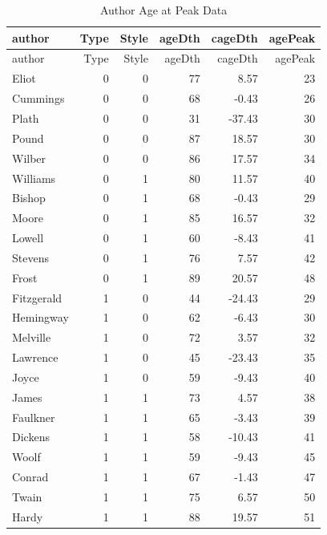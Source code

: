 \documentclass[
]{book}
\begin{document}
\begin{longtable}[]{@{}lrrrrr@{}}
\caption{Author Age at Peak Data}\tabularnewline
\toprule\noalign{}
author & Type & Style & ageDth & cageDth & agePeak \\
\midrule\noalign{}
\endfirsthead
\toprule\noalign{}
author & Type & Style & ageDth & cageDth & agePeak \\
\midrule\noalign{}
\endhead
\bottomrule\noalign{}
\endlastfoot
Eliot & 0 & 0 & 77 & 8.57 & 23 \\
Cummings & 0 & 0 & 68 & -0.43 & 26 \\
Plath & 0 & 0 & 31 & -37.43 & 30 \\
Pound & 0 & 0 & 87 & 18.57 & 30 \\
Wilber & 0 & 0 & 86 & 17.57 & 34 \\
Williams & 0 & 1 & 80 & 11.57 & 40 \\
Bishop & 0 & 1 & 68 & -0.43 & 29 \\
Moore & 0 & 1 & 85 & 16.57 & 32 \\
Lowell & 0 & 1 & 60 & -8.43 & 41 \\
Stevens & 0 & 1 & 76 & 7.57 & 42 \\
Frost & 0 & 1 & 89 & 20.57 & 48 \\
Fitzgerald & 1 & 0 & 44 & -24.43 & 29 \\
Hemingway & 1 & 0 & 62 & -6.43 & 30 \\
Melville & 1 & 0 & 72 & 3.57 & 32 \\
Lawrence & 1 & 0 & 45 & -23.43 & 35 \\
Joyce & 1 & 0 & 59 & -9.43 & 40 \\
James & 1 & 1 & 73 & 4.57 & 38 \\
Faulkner & 1 & 1 & 65 & -3.43 & 39 \\
Dickens & 1 & 1 & 58 & -10.43 & 41 \\
Woolf & 1 & 1 & 59 & -9.43 & 45 \\
Conrad & 1 & 1 & 67 & -1.43 & 47 \\
Twain & 1 & 1 & 75 & 6.57 & 50 \\
Hardy & 1 & 1 & 88 & 19.57 & 51 \\
\end{longtable}
\end{document}
